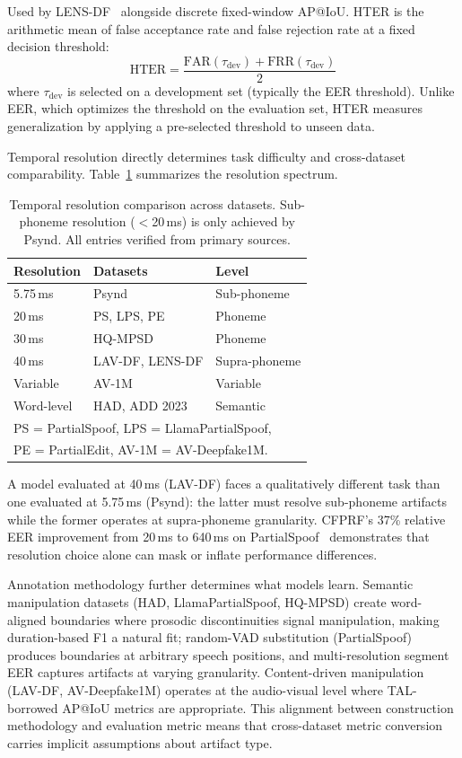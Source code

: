\documentclass[journal]{IEEEtran}
\begin{document}
Used by LENS-DF~\cite{liu2025lensdf} alongside discrete fixed-window AP@IoU. HTER is the arithmetic mean of false acceptance rate and false rejection rate at a fixed decision threshold:
\begin{equation}
\label{eq:hter}
\text{HTER} = \frac{\text{FAR}(\tau_\text{dev}) + \text{FRR}(\tau_\text{dev})}{2}
\end{equation}
where $\tau_\text{dev}$ is selected on a development set (typically the EER threshold). Unlike EER, which optimizes the threshold on the evaluation set, HTER measures generalization by applying a pre-selected threshold to unseen data.

Temporal resolution directly determines task difficulty and cross-dataset comparability. Table~\ref{tab:resolution} summarizes the resolution spectrum.

\begin{table}[t]
\centering
\caption{Temporal resolution comparison across datasets. Sub-phoneme resolution ($<$20\,ms) is only achieved by Psynd. All entries verified from primary sources.}
\label{tab:resolution}
\small
\begin{tabular}{lll}
\toprule
\textbf{Resolution} & \textbf{Datasets} & \textbf{Level} \\
\midrule
5.75\,ms & Psynd & Sub-phoneme \\
20\,ms & PS, LPS, PE & Phoneme \\
30\,ms & HQ-MPSD & Phoneme \\
40\,ms & LAV-DF, LENS-DF & Supra-phoneme \\
Variable & AV-1M & Variable \\
Word-level & HAD, ADD 2023 & Semantic \\
\bottomrule
\multicolumn{3}{l}{\footnotesize PS = PartialSpoof, LPS = LlamaPartialSpoof,} \\
\multicolumn{3}{l}{\footnotesize PE = PartialEdit, AV-1M = AV-Deepfake1M.}
\end{tabular}
\end{table}

A model evaluated at 40\,ms (LAV-DF) faces a qualitatively different task than one evaluated at 5.75\,ms (Psynd): the latter must resolve sub-phoneme artifacts while the former operates at supra-phoneme granularity. CFPRF's 37\% relative EER improvement from 20\,ms to 640\,ms on PartialSpoof~\cite{luong2025metrics} demonstrates that resolution choice alone can mask or inflate performance differences.

Annotation methodology further determines what models learn. Semantic manipulation datasets (HAD, LlamaPartialSpoof, HQ-MPSD) create word-aligned boundaries where prosodic discontinuities signal manipulation, making duration-based F1 a natural fit; random-VAD substitution (PartialSpoof) produces boundaries at arbitrary speech positions, and multi-resolution segment EER captures artifacts at varying granularity. Content-driven manipulation (LAV-DF, AV-Deepfake1M) operates at the audio-visual level where TAL-borrowed AP@IoU metrics are appropriate. This alignment between construction methodology and evaluation metric means that cross-dataset metric conversion carries implicit assumptions about artifact type.
\end{document}
